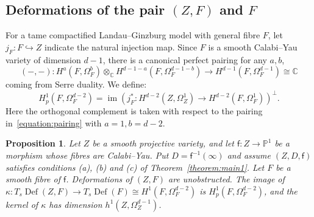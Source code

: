 \documentclass[10pt]{amsart}
\numberwithin{equation}{section}
\theoremstyle{plain}
\newtheorem{proposition}[theorem]{Proposition}
\theoremstyle{definition}
\theoremstyle{remark}
\DeclareMathOperator{\Def}{Def}
\DeclareMathOperator{\im}{im}
\begin{document}
\subsection{Deformations of the pair \texorpdfstring{\((Z,F)\)}{(Z,F)} and \texorpdfstring{\(F\)}{F}}\label{subsection:iacono-beauville}

For a tame compactified Landau--Ginzburg model with general fibre \(F\), let \(j_F \colon F \hookrightarrow Z\) indicate the natural injection map. Since \(F\) is a smooth Calabi--Yau variety of dimension \(d-1\), there is a canonical perfect pairing for any \(a,b\),
\begin{equation}\label{equation:pairing}
  (-,-): H^{a}(F,\Omega_F^b) \otimes_\mathbb{C} H^{d-1-a}(F,\Omega_F^{d-1-b}) \rightarrow H^{d-1}(F,\Omega_F^{d-1}) \cong \mathbb{C}
\end{equation}
coming from Serre duality. We define:
\[
  H^1_p(F,\Omega^{d-2}_F) = \im\left(j_{F}^* \colon H^{d-2}(Z,\Omega^{1}_Z)\rightarrow H^{d-2}(F,\Omega^{1}_F)\right)^\perp.
\]
Here the orthogonal complement is taken with respect to the pairing in~\eqref{equation:pairing} with \(a=1,b=d-2\).

\begin{proposition}\label{proposition:main}
  Let \(Z\) be a smooth projective variety, and let \(\mathsf{f} \colon Z\rightarrow \mathbb{P}^1\) be a morphism whose fibres are Calabi--Yau. Put \(D = \mathsf{f}^{-1}(\infty)\) and assume \((Z,D,\mathsf{f})\) satisfies conditions (a), (b) and (c) of Theorem~\ref{theorem:main1}. Let \(F\) be a smooth fibre of \(\mathsf{f}\). Deformations of \((Z,F)\) are unobstructed. The image of \(\kappa \colon T_s \Def(Z,F)\rightarrow T_s \Def(F) \cong H^1(F,\Omega^{d-2}_F)\) is \(H^1_p(F,\Omega_F^{d-2})\), and the kernel of \(\kappa\) has dimension \(h^1(Z,\Omega_Z^{d-1})\).
\end{proposition}
\end{document}
